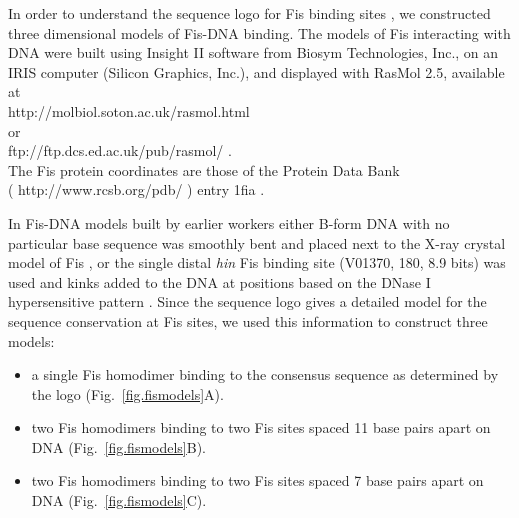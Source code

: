 \documentclass[doublespacing]{narfront}
\newcommand{\fig}[1]{Fig.~\ref{#1}} %
\newcommand{\latex}[1]{#1} %
\newcommand{\html}[1]{{ }} %
\newcommand{\htmladdnormallink}[1]{{ }} %
\begin{document}
In order to understand the sequence logo for Fis binding sites
\cite{Hengen.fisinfo},
we constructed three dimensional models of Fis-DNA binding.
The models of Fis interacting
with DNA
were built using
Insight II software
from Biosym Technologies, Inc.,
on an IRIS computer
(Silicon Graphics, Inc.),
and displayed with RasMol 2.5, available at
\\
\latex{http://molbiol.soton.ac.uk/rasmol.html}
\html{{\htmladdnormallink
{http://molbiol.soton.ac.uk/rasmol.html}
{http://molbiol.soton.ac.uk/rasmol.html}}}
\\
or
\\
\latex{ftp://ftp.dcs.ed.ac.uk/pub/rasmol/}
\html{{\htmladdnormallink
{ftp://ftp.dcs.ed.ac.uk/pub/rasmol/}
{ftp://ftp.dcs.ed.ac.uk/pub/rasmol/}}}.
\\
The Fis protein coordinates are those of the
Protein Data Bank
\\
(%
\latex{http://www.rcsb.org/pdb/}%
\html{{\htmladdnormallink
{http://www.rcsb.org/pdb/}
{http://www.rcsb.org/pdb/}}})
entry
\latex{1fia}%
\html{{\htmladdnormallink
{1fia}
{http://www.rcsb.org/pdb/cgi/explore.cgi?pid=11784981339478&pdbId=1FIA}}}.

In Fis-DNA models built by earlier workers
either B-form DNA with no particular base sequence was smoothly
bent and placed next to the X-ray crystal model of Fis
\cite{Kostrewa1991,Kostrewa1992},
or the single distal \emph{hin}
Fis binding site (V01370, 180, 8.9 bits)
was used and kinks added to the DNA
at positions based
on the DNase I hypersensitive pattern \cite{Yuan1991}.
Since the sequence logo gives a detailed model for the
sequence conservation at Fis sites, we used this
information to construct three models:

\begin{itemize}
\item
a single Fis homodimer binding to the consensus sequence as
determined by the logo
(\latex{\fig{fig.fismodels}A}).

\item
two Fis homodimers binding to two Fis sites spaced 11 base
pairs apart on DNA
(\latex{\fig{fig.fismodels}B}).

\item
two Fis homodimers binding to two Fis sites spaced 7 base
pairs apart on DNA
(\latex{\fig{fig.fismodels}C}).

\end{itemize}
\end{document}

